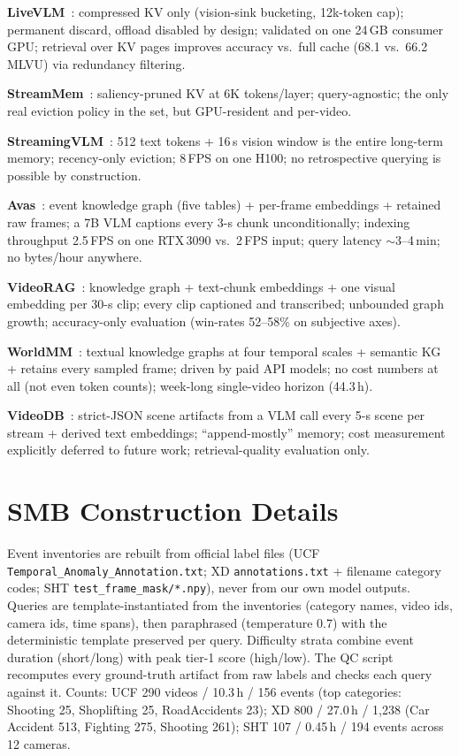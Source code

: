 \textbf{LiveVLM}~\cite{livevlm}: compressed KV only (vision-sink bucketing, 12k-token cap); permanent discard, offload disabled by design; validated on one 24\,GB consumer GPU; retrieval over KV pages improves accuracy vs.\ full cache (68.1 vs.\ 66.2 MLVU) via redundancy filtering.

\textbf{StreamMem}~\cite{streammem}: saliency-pruned KV at 6K tokens/layer; query-agnostic; the only real eviction policy in the set, but GPU-resident and per-video.

\textbf{StreamingVLM}~\cite{streamingvlm}: 512 text tokens + 16\,s vision window is the entire long-term memory; recency-only eviction; 8\,FPS on one H100; no retrospective querying is possible by construction.

\textbf{Avas}~\cite{avas}: event knowledge graph (five tables) + per-frame embeddings + retained raw frames; a 7B VLM captions every 3-s chunk unconditionally; indexing throughput 2.5\,FPS on one RTX\,3090 vs.\ 2\,FPS input; query latency $\sim$3--4\,min; no bytes/hour anywhere.

\textbf{VideoRAG}~\cite{videoraghkuds}: knowledge graph + text-chunk embeddings + one visual embedding per 30-s clip; every clip captioned and transcribed; unbounded graph growth; accuracy-only evaluation (win-rates 52--58\% on subjective axes).

\textbf{WorldMM}~\cite{worldmm}: textual knowledge graphs at four temporal scales + semantic KG + retains every sampled frame; driven by paid API models; no cost numbers at all (not even token counts); week-long single-video horizon (44.3\,h).

\textbf{VideoDB}~\cite{videodb}: strict-JSON scene artifacts from a VLM call every 5-s scene per stream + derived text embeddings; ``append-mostly'' memory; cost measurement explicitly deferred to future work; retrieval-quality evaluation only.

\section{SMB Construction Details}
\label{app:smb}

Event inventories are rebuilt from official label files (UCF \texttt{Temporal\_Anomaly\_Annotation.txt}; XD \texttt{annotations.txt} + filename category codes; SHT \texttt{test\_frame\_mask/*.npy}), never from our own model outputs. Queries are template-instantiated from the inventories (category names, video ids, camera ids, time spans), then paraphrased (temperature 0.7) with the deterministic template preserved per query. Difficulty strata combine event duration (short/long) with peak tier-1 score (high/low). The QC script recomputes every ground-truth artifact from raw labels and checks each query against it. Counts: UCF 290 videos / 10.3\,h / 156 events (top categories: Shooting 25, Shoplifting 25, RoadAccidents 23); XD 800 / 27.0\,h / 1{,}238 (Car Accident 513, Fighting 275, Shooting 261); SHT 107 / 0.45\,h / 194 events across 12 cameras.

